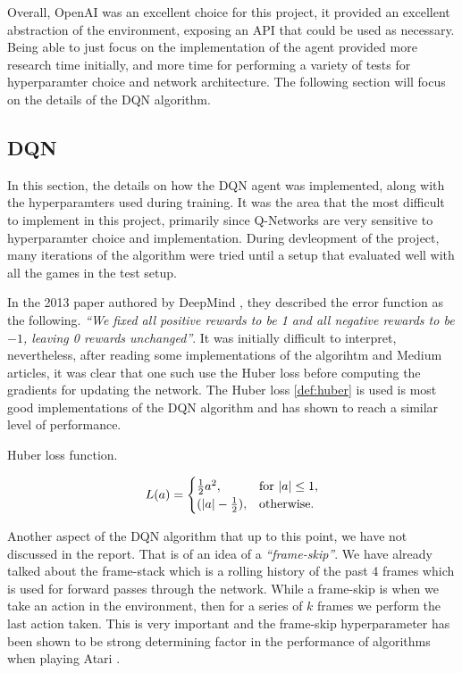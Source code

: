Overall, OpenAI was an excellent choice for this project, it provided an excellent abstraction of the environment, exposing an API that could be used as necessary. Being able to just focus on the implementation of the agent provided more research time initially, and more time for performing a variety of tests for hyperparamter choice and network architecture. The following section will focus on the details of the DQN algorithm.

\subsection{DQN}
In this section, the details on how the DQN agent was implemented, along with the hyperparamters used during training. It was the area that the most difficult to implement in this project, primarily since Q-Networks are very sensitive to hyperparamter choice and implementation. During devleopment of the project, many iterations of the algorithm were tried until a setup that evaluated well with all the games in the test setup.

In the 2013 paper authored by DeepMind \cite{dqn}, they described the error function as the following. \textit{``We fixed all positive rewards to be 1 and all negative rewards to be $-1$, leaving 0 rewards unchanged''}. It was initially difficult to interpret, nevertheless, after reading some implementations of the algorihtm and Medium articles, it was clear that one such use the Huber loss before computing the gradients for updating the network. The Huber loss \ref{def:huber} is used is most good implementations of the DQN algorithm and has shown to reach a similar level of performance.

\begin{defn}
  Huber loss function.

  \begin{equation}
    L(a)=\begin{cases}
      \frac{1}{2}a^2,          & \text{for $\abs{a} \leq 1$}, \\
      (\abs{a} - \frac{1}{2}), & \text{otherwise}.
    \end{cases}
  \end{equation}
  \label{def:huber}
\end{defn}

Another aspect of the DQN algorithm that up to this point, we have not discussed in the report. That is of an idea of a \textit{``frame-skip''}. We have already talked about the frame-stack which is a rolling history of the past 4 frames which is used for forward passes through the network. While a frame-skip is when we take an action in the environment, then for a series of $k$ frames we perform the last action taken. This is very important and the frame-skip hyperparameter has been shown to be strong determining factor in the performance of algorithms when playing Atari \cite{braylan2015frame}.

